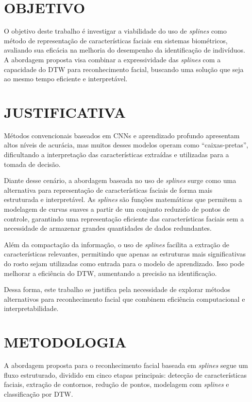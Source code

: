 \section{OBJETIVO}

O objetivo deste trabalho é investigar a viabilidade do uso de \textit{splines} como método de representação de características faciais em sistemas biométricos, avaliando sua eficácia na melhoria do desempenho da identificação de indivíduos. A abordagem proposta visa combinar a expressividade das \textit{splines} com a capacidade do DTW para reconhecimento facial, buscando uma solução que seja ao mesmo tempo eficiente e interpretável.

\section{JUSTIFICATIVA}

Métodos convencionais baseados em CNNs e aprendizado profundo apresentam altos níveis de acurácia, mas muitos desses modelos operam como “caixas-pretas”, dificultando a interpretação das características extraídas e utilizadas para a tomada de decisão.

Diante desse cenário, a abordagem baseada no uso de \textit{splines} surge como uma alternativa para representação de características faciais de forma mais estruturada e interpretável. As \textit{splines} são funções matemáticas que permitem a modelagem de curvas suaves a partir de um conjunto reduzido de pontos de controle, garantindo uma representação eficiente das características faciais sem a necessidade de armazenar grandes quantidades de dados redundantes.

Além da compactação da informação, o uso de \textit{splines} facilita a extração de características relevantes, permitindo que apenas as estruturas mais significativas do rosto sejam utilizadas como entrada para o modelo de aprendizado. Isso pode melhorar a eficiência do DTW, aumentando a precisão na identificação.

Dessa forma, este trabalho se justifica pela necessidade de explorar métodos alternativos para reconhecimento facial que combinem eficiência computacional e interpretabilidade.

\section{METODOLOGIA}

A abordagem proposta para o reconhecimento facial baseada em \textit{splines} segue um fluxo estruturado, dividido em cinco etapas principais: detecção de características faciais, extração de contornos, redução de pontos, modelagem com \textit{splines} e classificação por DTW.

